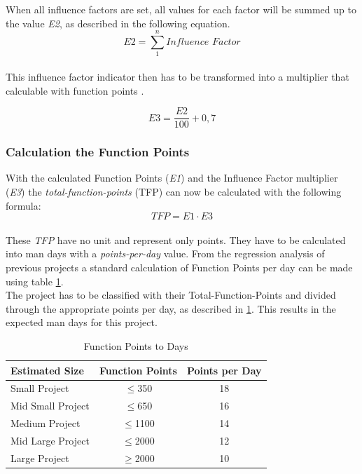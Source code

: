 When all influence factors are set, all values for each factor will be summed up to the value \textit{E2}, as described in the following equation. 
\begin{equation}
\textit{E2} =  \sum \limits_{1}^n   \textit{Influence Factor}  \label{fp:E2}
\end{equation}\\
This influence factor indicator then has to be transformed into a multiplier that calculable with function points \cite{Softwaremanagement}\cite{fpafundamentals}.  

\begin{equation}
	\textit{E3} =\frac{\textit{E2}}{100}  + 0,7 \label{fp:E3}
\end{equation}

\subsubsection{Calculation the Function Points}

With the calculated Function Points (\textit{E1}) and the Influence Factor multiplier (\textit{E3}) the \textit{total-function-points} (TFP) can now be calculated with the following formula:
\begin{equation}
	\textit{TFP} = \textit{E1} \cdot \textit{E3}  \label{fp:TFP}
\end{equation}\\
These \textit{TFP} have no unit and represent only points. They have to be calculated into man days with a \textit{points-per-day} value. From the regression analysis of previous projects a standard calculation of Function Points per day can be made using table \ref{tab:pointsperday}.\\
The project has to be classified with their Total-Function-Points and divided through the appropriate points per day, as described in \ref{tab:pointsperday}. This results in the expected man days for this project.\\
\begin{table}[h] 
	\centering 
	\setlength{\tabcolsep}{4pt}
	\begin{tabular}{|l|c|c|}\hline
		Estimated Size    & Function Points & Points per Day\\ \hline
		Small Project     & $\le$350        & 18 \\ \hline
		Mid Small Project & $\le$650        & 16 \\ \hline
		Medium Project    & $\le$1100 		& 14 \\ \hline
		Mid Large Project & $\le$2000 		& 12\\ \hline
		Large Project     & $\ge$2000 		& 10 \\ \hline
	\end{tabular}
	\caption{Function Points to Days} 
	\label{tab:pointsperday} 
\end{table} 

